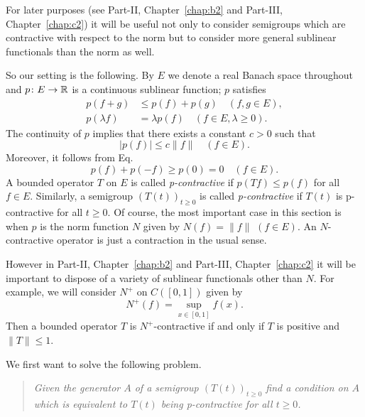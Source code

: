 For later purposes (see Part-II, Chapter~\ref{chap:b2} and Part-III, Chapter~\ref{chap:c2}) it will be useful not only to consider semigroups which are contractive with respect to the norm but to consider more general sublinear functionals than the norm as well.

So our setting is the following.
By $E$ we denote a real Banach space throughout and $p \colon E \to \mathbb{R}$ is a continuous sublinear function; \ie $p$ satisfies
\begin{equation}\label{eq:a2-2.1}
\begin{split}
p(f+g) &\leq p(f) + p(g) \quad (f, g \in E), \\%
p(\lambda f) &= \lambda p(f) \quad (f \in E, \lambda \geq 0). %
\end{split}
\end{equation}
The continuity of\/ $p$ implies that there exists a constant $c > 0$ such that
\begin{equation}\label{eq:a2-2.3}
	|p(f)| \leq c\|f\| \quad (f \in E).
\end{equation}
Moreover, it follows from Eq.~ 
\begin{equation*}\label{eq:a2-2.4}
	p(f) + p(-f) \geq p(0) = 0 \quad (f \in E).
\end{equation*}
A bounded operator $T$ on $E$ is called \emph{p-contractive} if\/ $p(Tf) \leq p(f)$ for all $f \in E$.
Similarly, a semigroup $(T(t))_{t\geq 0}$ is called \emph{p-contractive} if\/ $T(t)$ is p-contractive for all $t \geq 0$.
Of course, the most important case in this section is when $p$ is the norm function $N$ given by $N(f) = \|f\|$ $(f \in E)$.
An $N$-contractive operator is just a contraction in the usual sense.
\begin{remark*} \label{rem:a2-2.1-kgk}
However in Part-II, Chapter~\ref{chap:b2} and Part-III, Chapter~\ref{chap:c2} it will be important to dispose of a variety of sublinear functionals other than $N$.
For example, we will consider $N^{+}$ on $C([0,1])$ given by 
%
\[
	N^{+}(f) = \sup_{x \in [0,1]} f(x) .
\]
%
Then a bounded operator $T$ is $N^{+}$-contractive if and only if\/ $T$ is positive and $\|T\| \leq 1$.
\end{remark*}
We first want to solve the following problem.
\begin{quote}
\textit{Given the generator $A$ of a semigroup $(T(t))_{t\geq 0}$ find a condition on $A$ which is equivalent to $T(t)$ being p-contractive for all $t \geq 0$.}
\end{quote}
